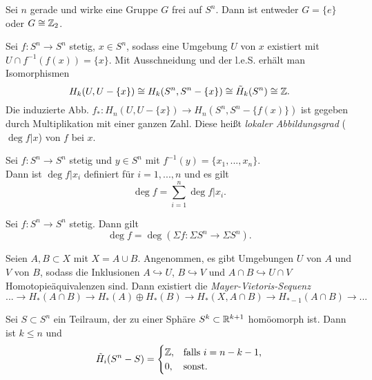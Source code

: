 \documentclass{cheat-sheet}
\newcommand{\RH}{\tilde{H}} %
\begin{document}
\begin{satz}
  Sei $n$ gerade und wirke eine Gruppe $G$ frei auf $S^n$. Dann ist entweder $G = \{ e \}$ oder $G \cong \mathbb{Z}_2$.
\end{satz}


\begin{defn}
  Sei $f : S^n \to S^n$ stetig, $x \in S^n$, sodass eine Umgebung $U$ von $x$ existiert mit $U \cap f^{-1}(f(x)) = \{ x \}$. Mit Ausschneidung und der l.e.S. erhält man Isomorphismen
  \[ H_k(U, U - \{ x \}) \cong H_k(S^n, S^n - \{ x \}) \cong \RH_k(S^n) \cong \Z. \]
  Die induzierte Abb. $f_* : H_n(U, U - \{ x \}) \to H_n(S^n, S^n - \{ f(x) \})$ ist gegeben durch Multiplikation mit einer ganzen Zahl. Diese heißt \emph{lokaler Abbildungsgrad} ($\deg f|x$) von $f$ bei $x$.
\end{defn}

\begin{prop}
  Sei $f : S^n \to S^n$ stetig und $y {\in} S^n$ mit $f^{-1}(y) = \{ x_1, ..., x_n \}$.\\
  Dann ist $\deg f|x_i$ definiert für $i = 1, ..., n$ und es gilt
  \[ \deg f = \sum_{i=1}^n \deg f|x_i. \]
\end{prop}

\begin{prop}
  Sei $f : S^n \to S^n$ stetig. Dann gilt
  \[ \deg f = \deg (\Sigma f : \Sigma S^n \to \Sigma S^n). \]
\end{prop}

\begin{prop}
  Seien $A, B \subset X$ mit $X = A \cup B$. Angenommen, es gibt Umgebungen $U$ von $A$ und $V$ von $B$, sodass die Inklusionen $A \hookrightarrow U$, $B \hookrightarrow V$ und $A \cap B \hookrightarrow U \cap V$ Homotopieäquivalenzen sind. Dann existiert die \emph{Mayer-Vietoris-Sequenz}
  \[ ... \to H_*(A \cap B) \to H_*(A) \oplus H_*(B) \to H_*(X, A \cap B) \to H_{*-1}(A \cap B) \to ... \]
\end{prop}

\begin{prop}
  Sei $S \subset S^n$ ein Teilraum, der zu einer Sphäre $S^k \subset \mathbb{R}^{k+1}$ homöomorph ist. Dann ist $k \leq n$ und
  \[ \RH_i(S^n - S) = \begin{cases}
    \Z, & \text{falls $i = n - k - 1$,} \\
    0, & \text{sonst.}
  \end{cases} \]
\end{prop}
\end{document}
